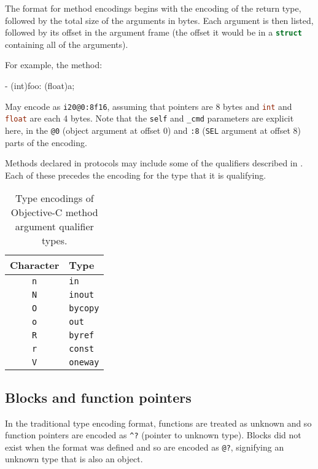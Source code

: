 \documentclass[a4paper]{report}
\newcommand{\ccode}[1]{\lstinline[language={C}]{#1}}
\newcommand{\objc}[1]{\lstinline[language={[Objective]C}]{#1}}
\begin{document}
The format for method encodings begins with the encoding of the return type, followed by the total size of the arguments in bytes.
Each argument is then listed, followed by its offset in the argument frame (the offset it would be in a \ccode{struct} containing all of the arguments).

For example, the method:
\begin{codesnippet}
- (int)foo: (float)a;
\end{codesnippet}

May encode as \texttt{i20@0:8f16}, assuming that pointers are 8 bytes and \ccode{int} and \ccode{float} are each 4 bytes.
Note that the \objc{self} and \objc{_cmd} parameters are explicit here, in the \texttt{@0} (object argument at offset 0) and \texttt{:8} (\objc{SEL} argument at offset 8) parts of the encoding.

Methods declared in protocols may include some of the qualifiers described in .
Each of these precedes the encoding for the type that it is qualifying.

\begin{table}
	\begin{center}
		\begin{tabular}{c|l}
			Character   & Type\\\hline
			\texttt{n} & \objc{in} \\
			\texttt{N} & \objc{inout} \\
			\texttt{O} & \objc{bycopy} \\
			\texttt{o} & \objc{out} \\
			\texttt{R} & \objc{byref} \\
			\texttt{r} & \objc{const} \\
			\texttt{V} & \objc{oneway}
		\end{tabular}
		\caption{\label{tab:objcqualencode}Type encodings of Objective-C method argument qualifier types.}
	\end{center}
\end{table}

\subsection{Blocks and function pointers}

In the traditional type encoding format, functions are treated as unknown and so function pointers are encoded as \texttt{\^{}?} (pointer to unknown type).
Blocks did not exist when the format was defined and so are encoded as \texttt{@?}, signifying an unknown type that is also an object.
\end{document}
